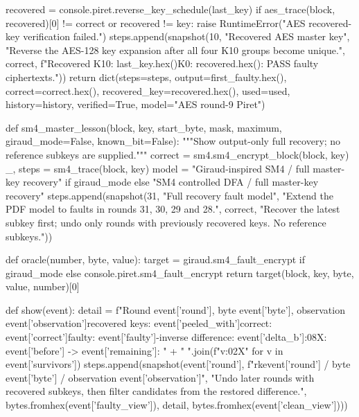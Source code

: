 \begin{lightcode}[numbers=left,firstnumber=1]
    recovered = console.piret.reverse_key_schedule(last_key)
    if aes_trace(block, recovered)[0] != correct or recovered != key:
        raise RuntimeError("AES recovered-key verification failed.")
    steps.append(snapshot(10, "Recovered AES master key", "Reverse the AES-128 key expansion after all four K10 groups become unique.", correct, f"Recovered K10: {last_key.hex()}\nRecovered K0: {recovered.hex()}\nVerification: PASS faulty ciphertexts."))
    return dict(steps=steps, output=first_faulty.hex(), correct=correct.hex(), recovered_key=recovered.hex(), used=used, history=history, verified=True, model="AES round-9 Piret")


def sm4_master_lesson(block, key, start_byte, mask, maximum, giraud_mode=False, known_bit=False):
    """Show output-only full recovery; no reference subkeys are supplied."""
    correct = sm4.sm4_encrypt_block(block, key)
    _, steps = sm4_trace(block, key)
    model = "Giraud-inspired SM4 / full master-key recovery" if giraud_mode else "SM4 controlled DFA / full master-key recovery"
    steps.append(snapshot(31, "Full recovery fault model", "Extend the PDF model to faults in rounds 31, 30, 29 and 28.", correct, "Recover the latest subkey first; undo only rounds with previously recovered keys. No reference subkeys."))

    def oracle(number, byte, value):
        target = giraud.sm4_fault_encrypt if giraud_mode else console.piret.sm4_fault_encrypt
        return target(block, key, byte, value, number)[0]

    def show(event):
        detail = f"Round {event['round']}, byte {event['byte']}, observation {event['observation']}\nAlready recovered keys: {event['peeled_with']}\nOriginal correct: {event['correct']}\nOriginal faulty: {event['faulty']}\nL-inverse difference: {event['delta_b']:08X}\nCandidates: {event['before']} -> {event['remaining']}\nSurvivors: " + " ".join(f"{v:02X}" for v in event['survivors'])
        steps.append(snapshot(event['round'], f"rk{event['round']} / byte {event['byte']} / observation {event['observation']}", "Undo later rounds with recovered subkeys, then filter candidates from the restored difference.", bytes.fromhex(event['faulty_view']), detail, bytes.fromhex(event['clean_view'])))


\end{lightcode}
